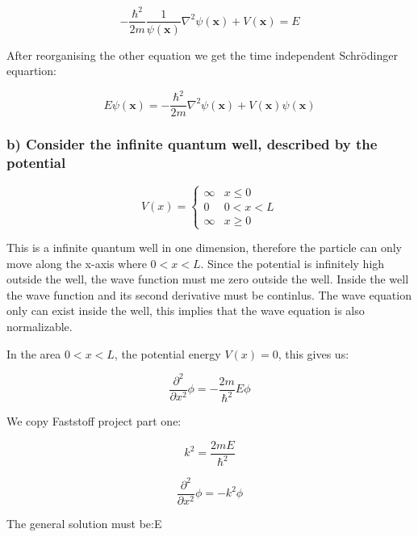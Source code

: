 \begin{equation*}
    -\frac{\hbar^2}{2m}\frac{1}{\psi(\mathbf{x})}\nabla^2\psi(\mathbf{x}) + V(\mathbf{x}) = E
\end{equation*}

After reorganising the other equation we get the time independent  Schrödinger equartion:
    
\begin{equation*}
    E \psi(\mathbf{x})=-\frac{\hbar^{2}}{2 m} \nabla^2 \psi(\mathbf{x})+V(\mathbf{x})\psi(\mathbf{x})
\end{equation*}

\subsubsection*{b) Consider the infinite quantum well, described by the potential}

\begin{equation*}
    V(x)=\left\{\begin{array}{ll}\infty & x \leq 0 \\ 0 & 0<x<L \\ \infty & x \geq 0\end{array}\right. 
\end{equation*}

This is a infinite quantum well in one dimension, therefore the particle can only move along the x-axis where $0<x<L$. Since the potential is infinitely high outside the well, the wave function must me zero outside the well. Inside the well the wave function and its second derivative must be continlus. The wave equation only can exist inside the well, this implies that the wave equation is also normalizable.

In the area $0<x<L$, the potential energy $V(x)=0$, this gives us:

\begin{equation*}
    \frac{\partial^2}{\partial x^2}\phi = -\frac{2m}{\hbar ^2} E\phi
\end{equation*}

We copy Faststoff project part one:

\begin{equation*}
    k^2=\frac{2mE}{\hbar ^2}
\end{equation*}

\begin{equation*}
    \frac{\partial^2}{\partial x^2}\phi =-k^2 \phi
\end{equation*}

The general solution must be:E

